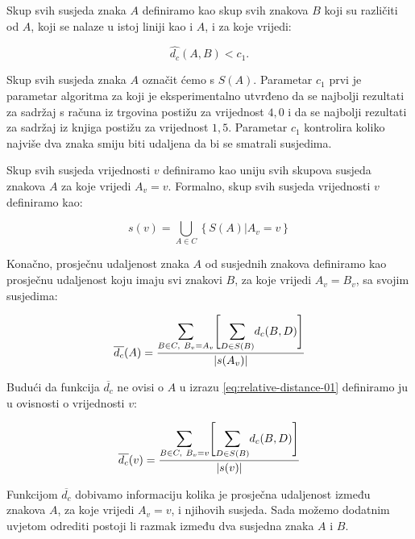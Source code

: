 \documentclass[times, utf8, zavrsni]{fer}
\begin{document}
Skup svih susjeda znaka $A$ definiramo kao skup svih znakova $B$ koji su
različiti od $A$, koji se nalaze u istoj liniji kao i $A$, i za koje vrijedi:

\begin{equation}
\hat{d_c}(A, B) < c_1 \texttt{.}
\end{equation}

Skup svih susjeda znaka $A$ označit ćemo s $S(A)$. Parametar $c_1$ prvi je
parametar algoritma za koji je eksperimentalno utvrđeno
da se najbolji rezultati za sadržaj s računa iz trgovina postižu za vrijednost
$4{,}0$ i da se najbolji rezultati za sadržaj iz knjiga postižu za vrijednost
$1{,}5$. Parametar $c_1$ kontrolira koliko najviše dva znaka smiju biti udaljena
da bi se smatrali susjedima.

Skup svih susjeda vrijednosti $v$ definiramo kao uniju svih skupova susjeda
znakova $A$ za koje vrijedi $A_v = v$. Formalno, skup svih susjeda vrijednosti
$v$ definiramo kao:

\begin{equation}
s(v) = \bigcup\limits_{A \in C}\left\{S(A) \vert A_v = v\right\}
\end{equation}

Konačno, prosječnu udaljenost znaka $A$ od susjednih znakova definiramo kao
prosječnu udaljenost koju imaju svi znakovi $B$, za koje vrijedi $A_v = B_v$,
sa svojim susjedima:

\begin{equation}
\label{eq:relative-distance-01}
\overline{d_c}(A) =
\frac{
    \mathlarger{\sum}\limits_{B \in C,\ B_v = A_v}
    \Bigg[
    \mathlarger{\sum}\limits_{D \in S(B)} d_c(B, D)
    \Bigg]
}{|s(A_v)|}
\end{equation}

Budući da funkcija $\overline{d_c}$ ne ovisi o $A$ u izrazu
\ref{eq:relative-distance-01} definiramo ju u ovisnosti o vrijednosti $v$:

\begin{equation}
\label{eq:relative-distance-02}
\overline{d_c}(v) =
\frac{
    \mathlarger{\sum}\limits_{B \in C,\ B_v = v}
    \Bigg[
    \mathlarger{\sum}\limits_{D \in S(B)} d_c(B, D)
    \Bigg]
}{|s(v)|}
\end{equation}

Funkcijom $\overline{d_c}$ dobivamo informaciju kolika je prosječna udaljenost
između znakova $A$, za koje vrijedi $A_v = v$, i njihovih susjeda. Sada možemo
dodatnim uvjetom odrediti postoji li razmak između dva susjedna znaka $A$ i $B$.
\end{document}
